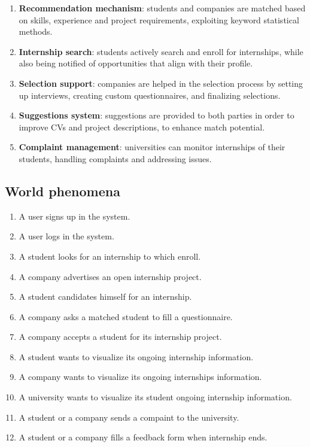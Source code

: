 \begin{enumerate}[label=\textbf{F\arabic* -}]
    \item \textbf{Recommendation mechanism}: students and companies are matched based on skills, experience and project requirements, exploiting keyword statistical methods.
    \item \textbf{Internship search}: students actively search and enroll for internships, while also being notified of opportunities that align with their profile.
    \item \textbf{Selection support}: companies are helped in the selection process by setting up interviews, creating custom questionnaires, and finalizing selections.
    \item \textbf{Suggestions system}: suggestions are provided to both parties in order to improve CVs and project descriptions, to enhance match potential.
    \item \textbf{Complaint management}: universities can monitor internships of their students, handling complaints and addressing issues.
\end{enumerate}

\subsection{World phenomena}

\begin{enumerate}[label=\textbf{WP\arabic* -}]
    \item A user signs up in the system.
    \item A user logs in the system.
    \item A student looks for an internship to which enroll.
    \item A company advertises an open internship project.
    \item A student candidates himself for an internship.
    \item A company asks a matched student to fill a questionnaire.
    \item A company accepts a student for its internship project.
    \item A student wants to visualize its ongoing internship information.
    \item A company wants to visualize its ongoing internships information.
    \item A university wants to visualize its student ongoing internship information.
    \item A student or a company sends a compaint to the university.
    \item A student or a company fills a feedback form when internship ends.
\end{enumerate}

